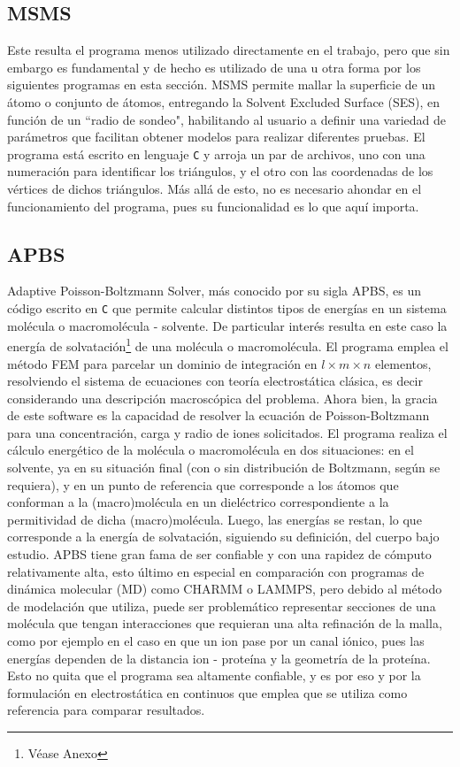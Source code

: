 \documentclass[12pt, oneside, numbers, spanish]{ezthesis}
\numberwithin{equation}{section}
\begin{document}
\subsection{MSMS}
Este resulta el programa menos utilizado directamente en el trabajo, pero que sin embargo es fundamental y de hecho es utilizado de una u otra forma por los siguientes programas en esta sección. MSMS permite mallar la superficie de un átomo o conjunto de átomos, entregando la Solvent Excluded Surface (SES), en función de un ``radio de sondeo", habilitando al usuario a definir una variedad de parámetros que facilitan obtener modelos para realizar diferentes pruebas. El programa está escrito en lenguaje \texttt{C} y arroja un par de archivos, uno con una numeración para identificar los triángulos, y el otro con las coordenadas de los vértices de dichos triángulos. Más allá de esto, no es necesario ahondar en el funcionamiento del programa, pues su funcionalidad es lo que aquí importa.

\subsection{APBS}
Adaptive Poisson-Boltzmann Solver, más conocido por su sigla APBS, es un código escrito en \texttt{C} que permite calcular distintos tipos de energías en un sistema molécula o macromolécula - solvente. De particular interés resulta en este caso la energía de solvatación\footnote{Véase Anexo} de una molécula o macromolécula. El programa emplea el método FEM para parcelar un dominio de integración en $l\times m\times n$ elementos, resolviendo el sistema de ecuaciones con teoría electrostática clásica, es decir considerando una descripción macroscópica del problema. Ahora bien, la gracia de este software es la capacidad de resolver la ecuación de Poisson-Boltzmann para una concentración, carga y radio de iones solicitados. El programa realiza el cálculo energético de la molécula o macromolécula en dos situaciones: en el solvente, ya en su situación final (con o sin distribución de Boltzmann, según se requiera), y en un punto de referencia que corresponde a los átomos que conforman a la (macro)molécula en un dieléctrico correspondiente a la permitividad de dicha (macro)molécula. Luego, las energías se restan, lo que corresponde a la energía de solvatación, siguiendo su definición, del cuerpo bajo estudio. APBS tiene gran fama de ser confiable y con una rapidez de cómputo relativamente alta, esto último en especial en comparación con programas de dinámica molecular (MD) como CHARMM o LAMMPS, pero debido al método de modelación que utiliza, puede ser problemático representar secciones de una molécula que tengan interacciones que requieran una alta refinación de la malla, como por ejemplo en el caso en que un ion pase por un canal iónico, pues las energías dependen de la distancia ion - proteína y la geometría de la proteína. Esto no quita que el programa sea altamente confiable, y es por eso y por la formulación en electrostática en continuos que emplea que se utiliza como referencia para comparar resultados.
\end{document}
